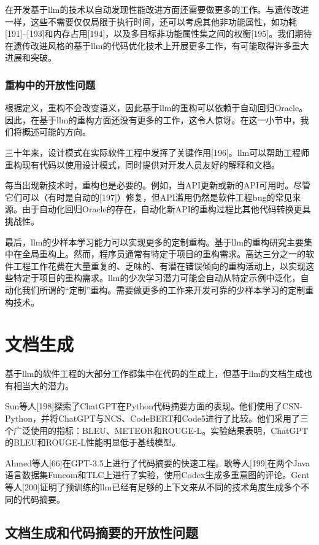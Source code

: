 \begin{translation}
在开发基于llm的技术以自动发现性能改进方面还需要做更多的工作。与遗传改进一样，这些不需要仅仅局限于执行时间，还可以考虑其他非功能属性，如功耗[191]–[193]和内存占用[194]，以及多目标非功能属性集之间的权衡[195]。我们期待在遗传改进风格的基于llm的代码优化技术上开展更多工作，有可能取得许多重大进展和突破。

\subsubsection{重构中的开放性问题}

根据定义，重构不会改变语义，因此基于llm的重构可以依赖于自动回归Oracle。因此，在基于llm的重构方面还没有更多的工作，这令人惊讶。在这一小节中，我们将概述可能的方向。

三十年来，设计模式在实际软件工程中发挥了关键作用[196]。llm可以帮助工程师重构现有代码以使用设计模式，同时提供对开发人员友好的解释和文档。

每当出现新技术时，重构也是必要的。例如，当API更新或新的API可用时。尽管它们可以（有时是自动的[197]）修复，但API滥用仍然是软件工程bug的常见来源。由于自动化回归Oracle的存在，自动化新API的重构过程比其他代码转换更具挑战性。

最后，llm的少样本学习能力可以实现更多的定制重构。基于llm的重构研究主要集中在全局重构上。然而，程序员通常有特定于项目的重构需求。高达三分之一的软件工程工作花费在大量重复的、乏味的、有潜在错误倾向的重构活动上，以实现这些特定于项目的重构需求。llm的少次学习潜力可能会自动从特定示例中泛化，自动化我们所谓的“定制”重构。需要做更多的工作来开发可靠的少样本学习的定制重构技术。

\section{文档生成}

基于llm的软件工程的大部分工作都集中在代码的生成上，但基于llm的文档生成也有相当大的潜力。

Sun等人[198]探索了ChatGPT在Python代码摘要方面的表现。他们使用了CSN-Python，并将ChatGPT与NCS、CodeBERT和Code5进行了比较。他们采用了三个广泛使用的指标：BLEU、METEOR和ROUGE-L。实验结果表明，ChatGPT的BLEU和ROUGE-L性能明显低于基线模型。

Ahmed等人[66]在GPT-3.5上进行了代码摘要的快速工程。耿等人[199]在两个Java语言数据集Funcom和TLC上进行了实验，使用Codex生成多重意图的评论。Gent等人[200]证明了预训练的llm已经有足够的上下文来从不同的技术角度生成多个不同的代码摘要。

\subsection{文档生成和代码摘要的开放性问题}


\end{translation}
